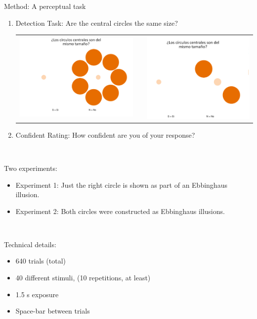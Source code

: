 \documentclass[final]{beamer}
\newlength{\onecolwid}
\begin{document}
\begin{frame}[t]
\begin{columns}[t]
\begin{column}{\onecolwid}
\begin{alertblock}{Method: A perceptual task}
$\quad$
\begin{enumerate}
\item Detection Task: Are the central circles the same size?
\begin{center}
\begin{tabular}{ccc}
\includegraphics[width=0.45\linewidth]{Figures/MainTask.png} & \hfill & \includegraphics[width=0.4\linewidth]{Figures/MainTask2.png}
\end{tabular}
\end{center}
\item Confident Rating: How confident are you of your response?
\end{enumerate}
$\qquad$

Two experiments: 

\begin{itemize}
\item Experiment 1: Just the right circle is shown as part of an Ebbinghaus illusion.
\item Experiment 2: Both circles were constructed as Ebbinghaus illusions.
\end{itemize}

$\qquad$

Technical details: 

\begin{itemize}
\item 640 trials (total)
\item 40 different stimuli, (10 repetitions, at least)
\item 1.5 s exposure
\item Space-bar between trials
\end{itemize}
\end{alertblock}


\end{column}
\end{columns}
\end{frame}
\end{document}
